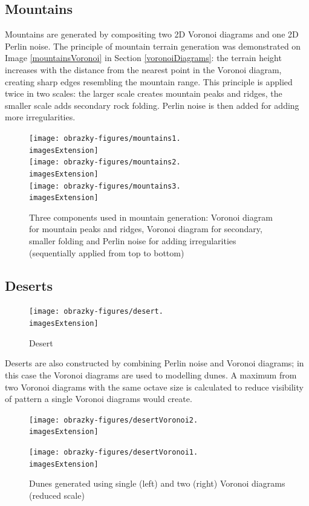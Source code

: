\subsection{Mountains}
Mountains are generated by compositing two 2D Voronoi diagrams and one 2D Perlin noise. The principle of mountain terrain generation was demonstrated on Image \ref{mountainsVoronoi} in Section \ref{voronoiDiagrams}: the terrain height increases with the distance from the nearest point in the Voronoi diagram, creating sharp edges resembling the mountain range. This principle is applied twice in two scales: the larger scale creates mountain peaks and ridges, the smaller scale adds secondary rock folding. Perlin noise is then added for adding more irregularities.

\begin{figure}[H]
	\centering
	\texttt{[image: obrazky-figures/mountains1.\\imagesExtension]}
	\\ \vspace{1cm}
	\texttt{[image: obrazky-figures/mountains2.\\imagesExtension]}
	\\ \vspace{1cm}
	\texttt{[image: obrazky-figures/mountains3.\\imagesExtension]}
	\caption{Three components used in mountain generation: Voronoi diagram for mountain peaks and ridges, Voronoi diagram for secondary, smaller folding and Perlin noise for adding irregularities (sequentially applied from top to bottom)}
\end{figure}

\subsection{Deserts}
\begin{figure}[H]
	\texttt{[image: obrazky-figures/desert.\\imagesExtension]}
	\caption{Desert}
\end{figure}

Deserts are also constructed by combining Perlin noise and Voronoi diagrams; in this case the Voronoi diagrams are used to modelling dunes. A maximum from two Voronoi diagrams with the same octave size is calculated to reduce visibility of pattern a single Voronoi diagrams would create.

\begin{figure}[H]
	\centering
	\begin{minipage}[t]{0.49\textwidth}
		\texttt{[image: obrazky-figures/desertVoronoi2.\\imagesExtension]}
	\end{minipage}
	\hfill
	\begin{minipage}[t]{0.49\textwidth}
		\texttt{[image: obrazky-figures/desertVoronoi1.\\imagesExtension]}
	\end{minipage}
	\caption{Dunes generated using single (left) and two (right) Voronoi diagrams (reduced scale)}
\end{figure}

